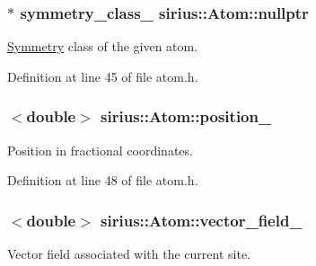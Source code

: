 \hypertarget{classsirius_1_1_atom_aea027772299819d737fa1454307bc682}{}
\subsubsection[{nullptr}]{$\ast$ symmetry\+\_\+class\+\_\+ sirius\+::\+Atom\+::nullptr\hspace{0.3cm}{\ttfamily [private]}}\label{classsirius_1_1_atom_aea027772299819d737fa1454307bc682}


\hyperlink{classsirius_1_1_symmetry}{Symmetry} class of the given atom. 



Definition at line 45 of file atom.\+h.

\hypertarget{classsirius_1_1_atom_af74add3169482e72aba3f9b23130542b}{}
\subsubsection[{position\+\_\+}]{$<$double$>$ sirius\+::\+Atom\+::position\+\_\+\hspace{0.3cm}{\ttfamily [private]}}\label{classsirius_1_1_atom_af74add3169482e72aba3f9b23130542b}


Position in fractional coordinates. 



Definition at line 48 of file atom.\+h.

\hypertarget{classsirius_1_1_atom_a50f70e73b2889ee6594d0f888fe9f1d2}{}
\subsubsection[{vector\+\_\+field\+\_\+}]{$<$double$>$ sirius\+::\+Atom\+::vector\+\_\+field\+\_\+\hspace{0.3cm}{\ttfamily [private]}}\label{classsirius_1_1_atom_a50f70e73b2889ee6594d0f888fe9f1d2}


Vector field associated with the current site. 



